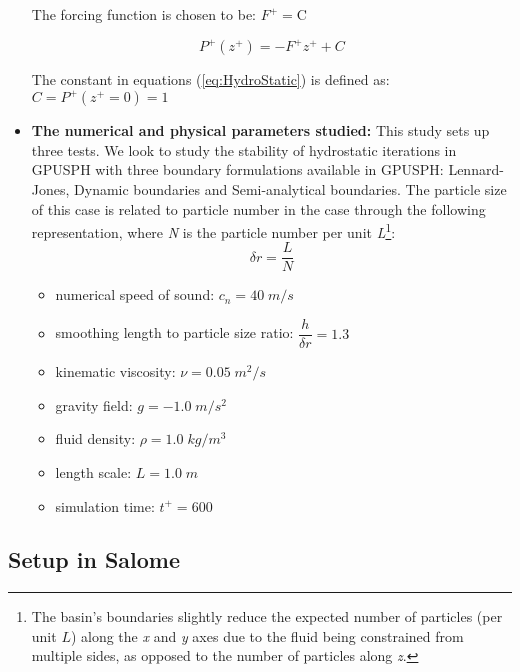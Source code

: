 \documentclass{../GPUSPHtemplate}
\begin{document}
\begin{itemize}
  The forcing function is chosen to be: $ F^+ = \text{C}  $  
    
  \begin{equation}\label{eq:HydroStatic}
    P^+(z^+) =  -F^{+} z^+  + C
  \end{equation}
  
  The constant in equations (\ref{eq:HydroStatic}) is defined as:\\
  $C = P^+(z^+ = 0) = 1$
  
\item \textbf{The numerical and physical parameters studied:} This study sets up three tests.
  We look to study the stability of hydrostatic iterations in GPUSPH with three boundary formulations available in GPUSPH:
  Lennard-Jones, Dynamic boundaries and Semi-analytical boundaries.
  The particle size of this case is related to particle number in the case through the following representation,
  where \textit{N} is the particle number per unit
  \textit{L}\footnote{The basin's boundaries slightly reduce the expected number of particles (per unit $L$)
    along the \textit{x} and \textit{y} axes due to the fluid being constrained from multiple sides,
    as opposed to the number of particles along \textit{z}. }:
  \begin{equation}
    \delta r = \frac{L}{N} 
  \end{equation}            
  
  \begin{itemize}
  \item numerical speed of sound: ${c_n} = 40 \; m/s$
  \item smoothing length to particle size ratio: $\dfrac{h}{\delta r}=1.3$ 
  \item kinematic viscosity: $\nu = 0.05 \; {m^2}/{s}$
  \item gravity field: $g = -1.0 \; {m}/{s^2}$
  \item fluid density: $\rho = 1.0 \; {kg}/{m^3} $
  \item length scale: $L = 1.0 \; m$
  \item simulation time: $t^+ = 600 $ 
  \end{itemize}
\end{itemize}

\subsection{Setup in Salome}
\end{document}
